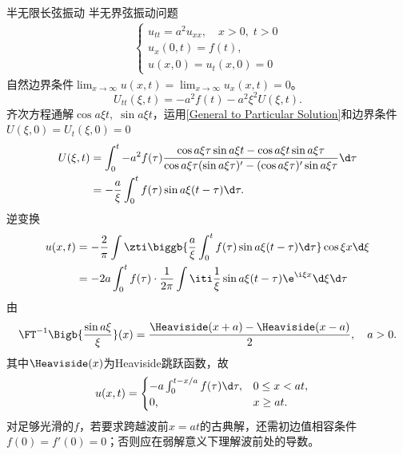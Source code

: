 \begin{example}{半无限长弦振动}{}
	半无界弦振动问题
	\begin{align*}
		\begin{cases}
			u_{tt}=a^2u_{xx},\quad x>0,\;t>0\\
			u_x(0,t)=f(t),\\ %
			u(x,0)=u_t(x,0)=0
		\end{cases}
	\end{align*}
	自然边界条件$\lim_{x\to\infty}u(x,t)=\lim_{x\to\infty}u_x(x,t)=0$。
	\[
		U_{tt}(\xi,t)=-a^2f(t)-a^2\xi^2U(\xi,t).
	\]
	齐次方程通解$\cos a\xi t,\;\sin a\xi t$，运用\eqref{General to Particular Solution}和边界条件$U(\xi,0)=U_t(\xi,0)=0$
	\begin{align*}
		U(\xi,t)&=\int_0^t-a^2f(\tau)\frac{\cos a\xi\tau\sin a\xi t-\cos a\xi t\sin a\xi\tau}{\cos a\xi\tau(\sin a\xi\tau)'-(\cos a\xi\tau)'\sin a\xi\tau}\d\tau\\
		&=-\frac a\xi\int_0^tf(\tau)\sin a\xi(t-\tau)\d\tau.
	\end{align*}
	逆变换
	\begin{align*}
		u(x,t)&=-\frac{2}\pi\int\zti\biggb{\frac a\xi\int_0^tf(\tau)\sin a\xi(t-\tau)\d\tau}\cos \xi x\d\xi\\
		&=-2a\int_0^tf(\tau)\cdot\frac1{2\pi}\int\iti\frac1\xi\sin a\xi(t-\tau)\e^{\i\xi x}\d\xi\d\tau
	\end{align*}
	由
	\[
		\FT^{-1}\Bigb{\frac{\sin a\xi}\xi}(x)=\frac{\Heaviside(x+a)-\Heaviside(x-a)}2,\quad a>0.
	\]
	其中$\Heaviside(x)$为Heaviside跳跃函数，故
	\begin{align*}
		u(x,t)  &%
		=\begin{cases}-a\int_0^{t-x/a}f(\tau)\d\tau,&0\leq x<at,\\0,&x\geq at.\end{cases}
	\end{align*}
对足够光滑的$f$，若要求跨越波前$x=at$的古典解，还需初边值相容条件$f(0)=f'(0)=0$；否则应在弱解意义下理解波前处的导数。
\end{example}
